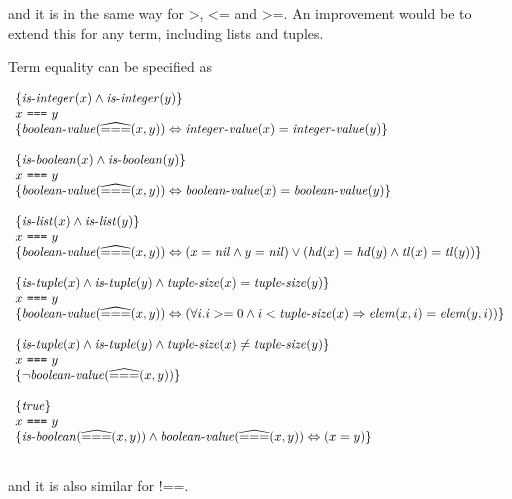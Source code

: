 and it is in the same way for $\texttt{>}$, $\texttt{<=}$ and $\texttt{>=}$. An
improvement would be to extend this for any term, including lists and tuples.

Term equality can be specified as

\[
\begin{array}{l}
\{ \mathit{is\mbox{-}integer}(x) \wedge \mathit{is\mbox{-}integer}(y) \}\\
x~\texttt{===}~y\\
\{ \mathit{boolean\mbox{-}value}(\widehat{===}(x, y)) \Leftrightarrow \mathit{integer\mbox{-}value}(x) = \mathit{integer\mbox{-}value}(y) \}\\
\\
\{ \mathit{is\mbox{-}boolean}(x) \wedge \mathit{is\mbox{-}boolean}(y) \}\\
x~\texttt{===}~y\\
\{ \mathit{boolean\mbox{-}value}(\widehat{===}(x, y)) \Leftrightarrow \mathit{boolean\mbox{-}value}(x) = \mathit{boolean\mbox{-}value}(y) \}\\
\\
\{ \mathit{is\mbox{-}list}(x) \wedge \mathit{is\mbox{-}list}(y) \}\\
x~\texttt{===}~y\\
\{ \mathit{boolean\mbox{-}value}(\widehat{===}(x, y)) \Leftrightarrow 
  (x = \mathit{nil} \wedge y = \mathit{nil})
  \vee (\mathit{hd}(x) = \mathit{hd}(y) \land \mathit{tl}(x) = \mathit{tl}(y)) \}\\
\\
\{ \mathit{is\mbox{-}tuple}(x) \wedge \mathit{is\mbox{-}tuple}(y) \wedge \mathit{tuple\mbox{-}size}(x) = \mathit{tuple\mbox{-}size}(y) \}\\
x~\texttt{===}~y\\
\{ \mathit{boolean\mbox{-}value}(\widehat{===}(x, y)) \Leftrightarrow 
  (\forall i. i >= 0 \wedge i < \mathit{tuple\mbox{-}size}(x) \Rightarrow \mathit{elem}(x, i) = \mathit{elem}(y, i)) \}\\
\\
\{ \mathit{is\mbox{-}tuple}(x) \wedge \mathit{is\mbox{-}tuple}(y) \wedge \mathit{tuple\mbox{-}size}(x) \neq \mathit{tuple\mbox{-}size}(y) \}\\
x~\texttt{===}~y\\
\{ \neg\mathit{boolean\mbox{-}value}(\widehat{===}(x, y)) \}\\
\\
\{\mathit{true}\}\\
x~\texttt{===}~y\\
\{ \mathit{is\mbox{-}boolean}(\widehat{===}(x, y)) \wedge \mathit{boolean\mbox{-}value}(\widehat{===}(x, y)) \Leftrightarrow (x = y) \}\\
\\
\end{array}
\]

and it is also similar for $\texttt{!==}$.

